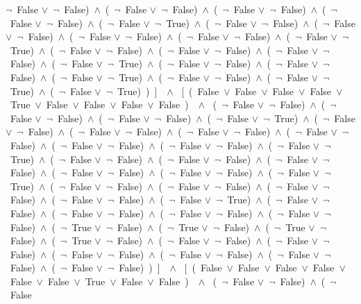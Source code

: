 ﻿\documentclass[a4paper,10pt]{article}
\begin{document}
 $\neg$\ False $\vee$\  $\neg$\ False)\ $\wedge$\ (\  $\neg$\ False $\vee$\  $\neg$\ False)\ $\wedge$\ (\  $\neg$\ False $\vee$\  $\neg$\ False)\ $\wedge$\ (\  $\neg$\ False $\vee$\  $\neg$\ False)\ $\wedge$\ (\  $\neg$\ False $\vee$\  $\neg$\ True)\ $\wedge$\ (\  $\neg$\ False $\vee$\  $\neg$\ False)\ $\wedge$\ (\  $\neg$\ False $\vee$\  $\neg$\ False)\ $\wedge$\ (\  $\neg$\ False $\vee$\  $\neg$\ False)\ $\wedge$\ (\  $\neg$\ False $\vee$\  $\neg$\ False)\ $\wedge$\ (\  $\neg$\ False $\vee$\  $\neg$\ True)\ $\wedge$\ (\  $\neg$\ False $\vee$\  $\neg$\ False)\ $\wedge$\ (\  $\neg$\ False $\vee$\  $\neg$\ False)\ $\wedge$\ (\  $\neg$\ False $\vee$\  $\neg$\ False)\ $\wedge$\ (\  $\neg$\ False $\vee$\  $\neg$\ True)\ $\wedge$\ (\  $\neg$\ False $\vee$\  $\neg$\ False)\ $\wedge$\ (\  $\neg$\ False $\vee$\  $\neg$\ False)\ $\wedge$\ (\  $\neg$\ False $\vee$\  $\neg$\ True)\ $\wedge$\ (\  $\neg$\ False $\vee$\  $\neg$\ False)\ $\wedge$\ (\  $\neg$\ False $\vee$\  $\neg$\ True)\ $\wedge$\ (\  $\neg$\ False $\vee$\  $\neg$\ True)\ )\ ]\ \ $\wedge$ \ [\ (\ False\ $\vee$\ False\ $\vee$\ False\ $\vee$\ False\ $\vee$\ True\ $\vee$\ False\ $\vee$\ False\ $\vee$\ False\ $\vee$\ False\ )\ \ $\wedge$ \ (\  $\neg$\ False $\vee$\  $\neg$\ False)\ $\wedge$\ (\  $\neg$\ False $\vee$\  $\neg$\ False)\ $\wedge$\ (\  $\neg$\ False $\vee$\  $\neg$\ False)\ $\wedge$\ (\  $\neg$\ False $\vee$\  $\neg$\ True)\ $\wedge$\ (\  $\neg$\ False $\vee$\  $\neg$\ False)\ $\wedge$\ (\  $\neg$\ False $\vee$\  $\neg$\ False)\ $\wedge$\ (\  $\neg$\ False $\vee$\  $\neg$\ False)\ $\wedge$\ (\  $\neg$\ False $\vee$\  $\neg$\ False)\ $\wedge$\ (\  $\neg$\ False $\vee$\  $\neg$\ False)\ $\wedge$\ (\  $\neg$\ False $\vee$\  $\neg$\ False)\ $\wedge$\ (\  $\neg$\ False $\vee$\  $\neg$\ True)\ $\wedge$\ (\  $\neg$\ False $\vee$\  $\neg$\ False)\ $\wedge$\ (\  $\neg$\ False $\vee$\  $\neg$\ False)\ $\wedge$\ (\  $\neg$\ False $\vee$\  $\neg$\ False)\ $\wedge$\ (\  $\neg$\ False $\vee$\  $\neg$\ False)\ $\wedge$\ (\  $\neg$\ False $\vee$\  $\neg$\ False)\ $\wedge$\ (\  $\neg$\ False $\vee$\  $\neg$\ True)\ $\wedge$\ (\  $\neg$\ False $\vee$\  $\neg$\ False)\ $\wedge$\ (\  $\neg$\ False $\vee$\  $\neg$\ False)\ $\wedge$\ (\  $\neg$\ False $\vee$\  $\neg$\ False)\ $\wedge$\ (\  $\neg$\ False $\vee$\  $\neg$\ False)\ $\wedge$\ (\  $\neg$\ False $\vee$\  $\neg$\ True)\ $\wedge$\ (\  $\neg$\ False $\vee$\  $\neg$\ False)\ $\wedge$\ (\  $\neg$\ False $\vee$\  $\neg$\ False)\ $\wedge$\ (\  $\neg$\ False $\vee$\  $\neg$\ False)\ $\wedge$\ (\  $\neg$\ False $\vee$\  $\neg$\ False)\ $\wedge$\ (\  $\neg$\ True $\vee$\  $\neg$\ False)\ $\wedge$\ (\  $\neg$\ True $\vee$\  $\neg$\ False)\ $\wedge$\ (\  $\neg$\ True $\vee$\  $\neg$\ False)\ $\wedge$\ (\  $\neg$\ True $\vee$\  $\neg$\ False)\ $\wedge$\ (\  $\neg$\ False $\vee$\  $\neg$\ False)\ $\wedge$\ (\  $\neg$\ False $\vee$\  $\neg$\ False)\ $\wedge$\ (\  $\neg$\ False $\vee$\  $\neg$\ False)\ $\wedge$\ (\  $\neg$\ False $\vee$\  $\neg$\ False)\ $\wedge$\ (\  $\neg$\ False $\vee$\  $\neg$\ False)\ $\wedge$\ (\  $\neg$\ False $\vee$\  $\neg$\ False)\ )\ ]\ \ $\wedge$ \ [\ (\ False\ $\vee$\ False\ $\vee$\ False\ $\vee$\ False\ $\vee$\ False\ $\vee$\ False\ $\vee$\ True\ $\vee$\ False\ $\vee$\ False\ )\ \ $\wedge$ \ (\  $\neg$\ False $\vee$\  $\neg$\ False)\ $\wedge$\ (\  $\neg$\ False 
\end{document}
